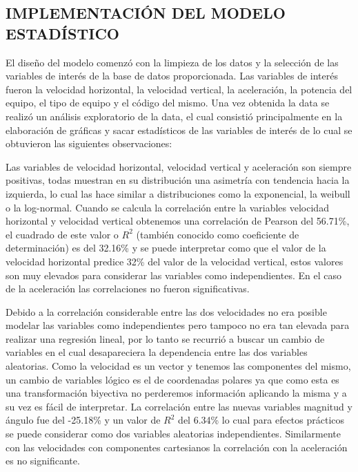 \subsection{IMPLEMENTACIÓN DEL MODELO ESTADÍSTICO}

El diseño del modelo comenzó con la limpieza de los datos y la selección de las
variables de interés de la base de datos proporcionada. Las variables de
interés fueron la velocidad horizontal, la velocidad vertical, la aceleración,
la potencia del equipo, el tipo de equipo y el código del mismo. Una vez
obtenida la data se realizó un análisis exploratorio de la data, el cual
consistió principalmente en la elaboración de gráficas y sacar estadísticos de
las variables de interés de lo cual se obtuvieron las siguientes observaciones:

Las variables de velocidad horizontal, velocidad vertical y aceleración son
siempre positivas, todas muestran en su distribución una asimetría con
tendencia hacia la izquierda, lo cual las hace similar a distribuciones como la
exponencial, la weibull o la log-normal. Cuando se calcula la correlación entre
la variables velocidad horizontal y velocidad vertical obtenemos una
correlación de Pearson del 56.71\%, el cuadrado de este valor o $R^2$ (también
conocido como coeficiente de determinación) es del 32.16\% y se puede
interpretar como que el valor de la velocidad horizontal predice 32\% del valor
de la velocidad vertical, estos valores son muy elevados para considerar las
variables como independientes. En el caso de la aceleración las correlaciones
no fueron significativas.

Debido a la correlación considerable entre las dos velocidades no era posible
modelar las variables como independientes pero tampoco no era tan elevada para
realizar una regresión lineal, por lo tanto se recurrió a buscar un cambio de
variables en el cual desapareciera la dependencia entre las dos variables
aleatorias. Como la velocidad es un vector y tenemos las componentes del mismo,
un cambio de variables lógico es el de coordenadas polares ya que como esta es
una transformación biyectiva no perderemos información aplicando la misma y a
su vez es fácil de interpretar. La correlación entre las nuevas variables
magnitud y ángulo fue del -25.18\% y un valor de $R^2$ del 6.34\% lo cual para
efectos prácticos se puede considerar como dos variables aleatorias
independientes. Similarmente con las velocidades con componentes cartesianos la
correlación con la aceleración es no significante.

